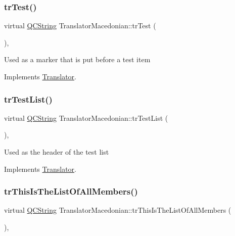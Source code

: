 \subsubsection{\texorpdfstring{trTest()}{trTest()}}
{\footnotesize\ttfamily virtual \mbox{\hyperlink{class_q_c_string}{Q\+C\+String}} Translator\+Macedonian\+::tr\+Test (\begin{DoxyParamCaption}{ }\end{DoxyParamCaption})\hspace{0.3cm}{\ttfamily [inline]}, {\ttfamily [virtual]}}

Used as a marker that is put before a test item 

Implements \mbox{\hyperlink{class_translator}{Translator}}.

\mbox{\label{class_translator_macedonian_aeb6f9ef5c06cf5c47afdb6e8f0d0f669}} 
\subsubsection{\texorpdfstring{trTestList()}{trTestList()}}
{\footnotesize\ttfamily virtual \mbox{\hyperlink{class_q_c_string}{Q\+C\+String}} Translator\+Macedonian\+::tr\+Test\+List (\begin{DoxyParamCaption}{ }\end{DoxyParamCaption})\hspace{0.3cm}{\ttfamily [inline]}, {\ttfamily [virtual]}}

Used as the header of the test list 

Implements \mbox{\hyperlink{class_translator}{Translator}}.

\mbox{\label{class_translator_macedonian_a84acf9931156663853249d91924b1d64}} 
\subsubsection{\texorpdfstring{trThisIsTheListOfAllMembers()}{trThisIsTheListOfAllMembers()}}
{\footnotesize\ttfamily virtual \mbox{\hyperlink{class_q_c_string}{Q\+C\+String}} Translator\+Macedonian\+::tr\+This\+Is\+The\+List\+Of\+All\+Members (\begin{DoxyParamCaption}{ }\end{DoxyParamCaption})\hspace{0.3cm}{\ttfamily [inline]}, {\ttfamily [virtual]}}

